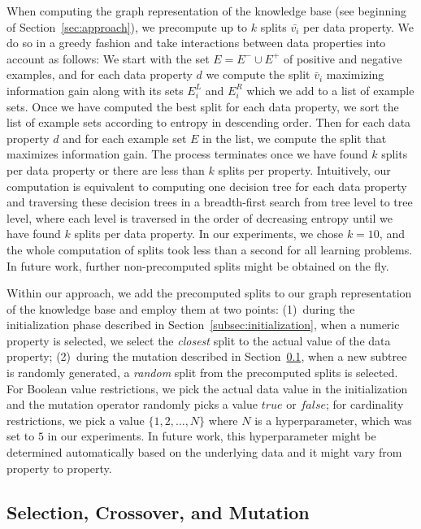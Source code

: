 When computing the graph representation of the knowledge base (see beginning of Section~\ref{sec:approach}), we precompute up to $k$ splits $\bar{v_i}$ per data property. We do so in a greedy fashion and take interactions between data properties into account as follows: We start with the set $E=E^{-} \cup E^{+}$ of positive and negative examples, and for each data property $d$ we compute the split $\bar{v}_i$ maximizing information gain along with its sets $E_i^L$ and $E_i^R$ which we add to a list of example sets. Once we have computed the best split for each data property, we sort the list of example sets according to entropy in descending order. Then for each data property $d$ and for each example set $E$ in the list, we compute the split that maximizes information gain. The process terminates once we have found $k$ splits per data property or there are less than $k$ splits per property. Intuitively, our computation is equivalent to computing one decision tree for each data property and traversing these decision trees in a breadth-first search from tree level to tree level, where each level is traversed in the order of decreasing entropy until we have found $k$ splits per data property. In our experiments, we chose $k=10$, and the whole computation of splits took less than a second for all learning problems. In future work, further non-precomputed splits might be obtained on the fly.

Within our approach, we add the precomputed splits to our graph representation of the knowledge base and employ them at two points: (1)~during the initialization phase described in Section~\ref{subsec:initialization}, when a numeric property is selected, we select the \emph{closest} split to the actual value of the data property; (2)~during the mutation described in Section~\ref{subsec:evolutionary-algorithm}, when a new subtree is randomly generated, a \emph{random} split from the precomputed splits is selected. For Boolean value restrictions, we pick the actual data value in the initialization and the mutation operator randomly picks a value $\mathit{true}$ or $\mathit{false}$; for cardinality restrictions, we pick a value $\{1, 2, \ldots, N\}$ where $N$ is a hyperparameter, which was set to $5$ in our experiments. In future work, this hyperparameter might be determined automatically based on the underlying data and it might vary from property to property.

\subsection{Selection, Crossover, and Mutation}%
\label{subsec:evolutionary-algorithm}

